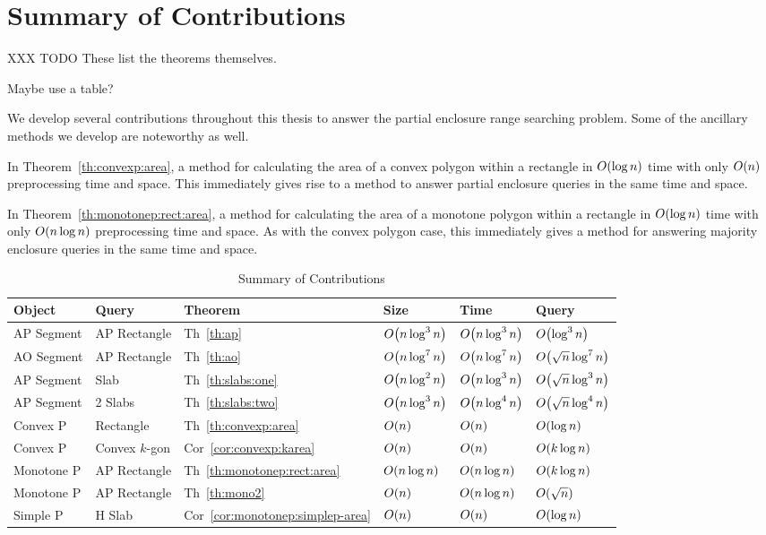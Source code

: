 \section{Summary of Contributions}
\label{:intro:contributions}

XXX TODO  These list the theorems themselves.

Maybe use a table?

We develop several contributions throughout this thesis to answer the partial enclosure range searching problem.  Some of the ancillary methods we develop are noteworthy as well.

In Theorem~\ref{th:convexp:area}, a method for calculating the area of a convex polygon within a rectangle in $O\!\left(\log{n}\right)$ time with only $O\!\left(n\right)$ preprocessing time and space. This immediately gives rise to a method to answer partial enclosure queries in the same time and space.

In Theorem~\ref{th:monotonep:rect:area}, a method for calculating the area of a monotone polygon within a rectangle in $O\!\left(\log{n}\right)$ time with only
$O\!\left(n \log{n}\right)$ preprocessing time and space. As with the convex polygon case, this immediately gives a method for answering majority enclosure queries in the same time and space.

\begin{table}[t]
\label{tab:contributions}
\caption{Summary of Contributions}
\centering
\begin{tabular}{l l l l l l}
\hline \hline
Object & Query & Theorem & Size & Time & Query \\
\hline
AP Segment & AP Rectangle & Th~\ref{th:ap} & $O\!\left(n\log^3{n}\right)$ & $O\!\left(n\log^3{n}\right)$ & $O\!\left(\log^3{n}\right)$ \\
AO Segment & AP Rectangle & Th~\ref{th:ao} & $O\!\left(n\log^7{n}\right)$ & $O\!\left(n\log^7{n}\right)$ & $O\!\left(\sqrt{n}\log^7{n}\right)$ \\
AP Segment & Slab & Th~\ref{th:slabs:one} & $O\!\left(n\log^2{n}\right)$ & $O\!\left(n\log^3{n}\right)$ & $O\!\left(\sqrt{n}\log^3{n}\right)$ \\
AP Segment & 2 Slabs & Th~\ref{th:slabs:two} & $O\!\left(n\log^3{n}\right)$ & $O\!\left(n\log^4{n}\right)$ & $O\!\left(\sqrt{n}\log^4{n}\right)$ \\
Convex P & Rectangle & Th~\ref{th:convexp:area} & $O\!\left(n\right)$ & $O\!\left(n\right)$ & $O\!\left(\log{n}\right)$ \\
Convex P & Convex $k$-gon & Cor~\ref{cor:convexp:karea} & $O\!\left(n\right)$ & $O\!\left(n\right)$ & $O\!\left(k \log{n}\right)$ \\
Monotone P & AP Rectangle & Th~\ref{th:monotonep:rect:area} & $O\!\left(n\log{n}\right)$ & $O\!\left(n\log{n}\right)$ & $O\!\left(k \log{n}\right)$ \\
Monotone P & AP Rectangle & Th~\ref{th:mono2} & $O\!\left(n\right)$ & $O\!\left(n\log{n}\right)$ & $O\!\left(\sqrt{n}\right)$ \\
Simple P & H Slab & Cor~\ref{cor:monotonep:simplep-area} & $O\!\left(n\right)$ & $O\!\left(n\right)$ & $O\!\left(\log{n}\right)$ \\
\hline
\end{tabular}
\end{table} 


